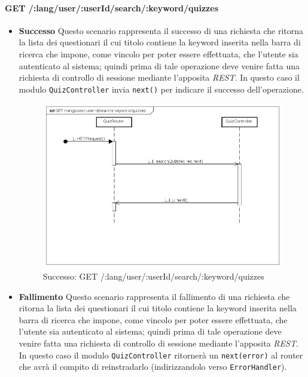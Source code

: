 \paragraph{GET /:lang/user/:userId/search/:keyword/quizzes}
\begin{itemize}
\item \textbf{Successo}
Questo scenario rappresenta il successo di una richiesta che ritorna la lista dei questionari il cui titolo contiene la keyword inserita nella barra di ricerca che impone, come vincolo per poter essere effettuata, che l'utente sia autenticato al sistema; quindi prima di tale operazione deve venire fatta una richiesta di controllo di sessione mediante l'apposita \textit{REST}. In questo caso il modulo \texttt{QuizController} invia \texttt{next()} per indicare il successo dell'operazione.

\begin{figure}[ht]
	\centering
	\includegraphics[scale=0.45]{UML/DiagrammiDiSequenza/Back-end/GET__lang_user__userId_search__keyword_quizzes_success.png}
	\caption{Successo: GET /:lang/user/:userId/search/:keyword/quizzes}
\end{figure}
\FloatBarrier

\item \textbf{Fallimento}
Questo scenario rappresenta il fallimento di una richiesta che ritorna la lista dei questionari il cui titolo contiene la keyword inserita nella barra di ricerca che impone, come vincolo per poter essere effettuata, che l'utente sia autenticato al sistema; quindi prima di tale operazione deve venire fatta una richiesta di controllo di sessione mediante l'apposita \textit{REST}. In questo caso il modulo \texttt{QuizController} ritornerà un \texttt{next(error)} al router che avrà il compito di reinstradarlo (indirizzandolo verso \texttt{ErrorHandler}).


\end{itemize}
